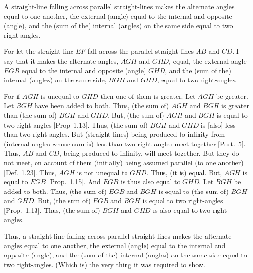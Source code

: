 \begin{Parallel}{}{}
{A straight-line falling across  parallel straight-lines makes the alternate angles
equal to one another,  the external (angle) equal to the internal and
opposite (angle), and the (sum of the) internal (angles) on the same side equal to
two right-angles.

\epsfysize=2.2in
\centerline{}

For let the straight-line $EF$ fall across the parallel straight-lines $AB$ and $CD$.
I say that it makes the  alternate angles, $AGH$ and $GHD$,  equal,  the
external angle $EGB$ equal to the internal and opposite (angle) $GHD$,
and the (sum of the) internal (angles) on the same side, $BGH$ and $GHD$, equal to
two right-angles.

For if $AGH$ is unequal to $GHD$ then one of them is greater. Let $AGH$ be greater.
Let $BGH$ have been added to both. Thus, (the sum of) $AGH$ and $BGH$ is greater
than (the sum of) $BGH$ and $GHD$. But, (the sum of) $AGH$ and $BGH$ is equal to two right-angles
[Prop~1.13]. Thus,  (the sum of) $BGH$ and $GHD$ is [also] less than two right-angles. 
But (straight-lines) being produced to infinity from (internal angles whose sum is) less than
two right-angles meet together [Post.~5]. Thus, $AB$ and $CD$, being produced to
infinity, will meet together. But they do not meet, on account of
them (initially) being assumed parallel (to one another) [Def.~1.23]. Thus, $AGH$ is not unequal to $GHD$. Thus, (it is) equal. But, $AGH$ is equal to $EGB$ [Prop.~1.15]. 
And $EGB$ is thus also equal to $GHD$.
Let $BGH$
be added to both. Thus, (the sum of) $EGB$ and $BGH$ is equal to (the sum of) $BGH$ and $GHD$.
But, (the sum of) $EGB$ and $BGH$ is equal to two right-angles [Prop.~1.13]. 
Thus, (the sum of) $BGH$ and $GHD$ is also equal to two right-angles.

Thus, a straight-line falling across parallel straight-lines makes the alternate angles
equal to one another,  the external (angle) equal to the internal and
opposite (angle), and the (sum of the) internal (angles) on the same side equal to
two right-angles. (Which is) the very thing it was required to show.}
\end{Parallel}

